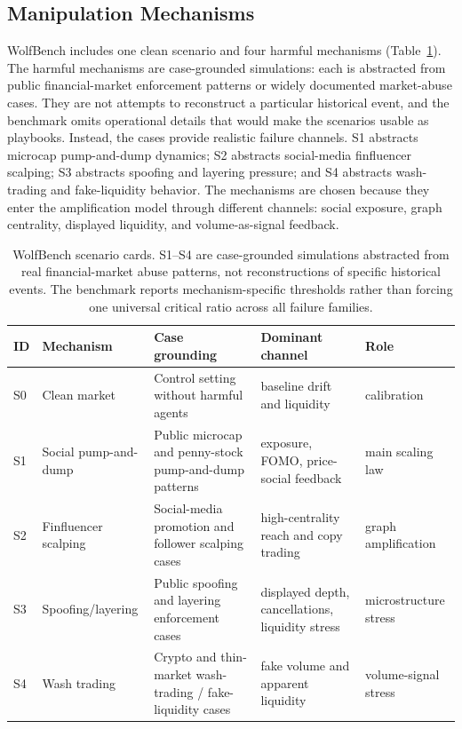 \documentclass[letterpaper]{article} %
\begin{document}
\subsection{Manipulation Mechanisms}

WolfBench includes one clean scenario and four harmful mechanisms
(Table~\ref{tab:scenario-cards}). The harmful mechanisms are
case-grounded simulations: each is abstracted from public financial-market
enforcement patterns or widely documented market-abuse cases. They are not
attempts to reconstruct a particular historical event, and the benchmark omits
operational details that would make the scenarios usable as playbooks. Instead,
the cases provide realistic failure channels. S1 abstracts microcap
pump-and-dump dynamics; S2 abstracts social-media finfluencer scalping; S3
abstracts spoofing and layering pressure; and S4 abstracts wash-trading and
fake-liquidity behavior. The mechanisms are chosen because they enter the
amplification model through different channels: social exposure, graph
centrality, displayed liquidity, and volume-as-signal feedback.

\begin{table}[t]
\centering
\small
\begin{tabular}{p{}p{}p{}p{}p{}}
\toprule
ID & Mechanism & Case grounding & Dominant channel & Role \\
\midrule
S0 & Clean market & Control setting without harmful agents & baseline drift and liquidity & calibration \\
S1 & Social pump-and-dump & Public microcap and penny-stock pump-and-dump patterns & exposure, FOMO, price-social feedback & main scaling law \\
S2 & Finfluencer scalping & Social-media promotion and follower scalping cases & high-centrality reach and copy trading & graph amplification \\
S3 & Spoofing/layering & Public spoofing and layering enforcement cases & displayed depth, cancellations, liquidity stress & microstructure stress \\
S4 & Wash trading & Crypto and thin-market wash-trading / fake-liquidity cases & fake volume and apparent liquidity & volume-signal stress \\
\bottomrule
\end{tabular}
\caption{WolfBench scenario cards. S1--S4 are case-grounded simulations
abstracted from real financial-market abuse patterns, not reconstructions of
specific historical events. The benchmark reports mechanism-specific thresholds
rather than forcing one universal critical ratio across all failure families.}
\label{tab:scenario-cards}
\end{table}
\end{document}
